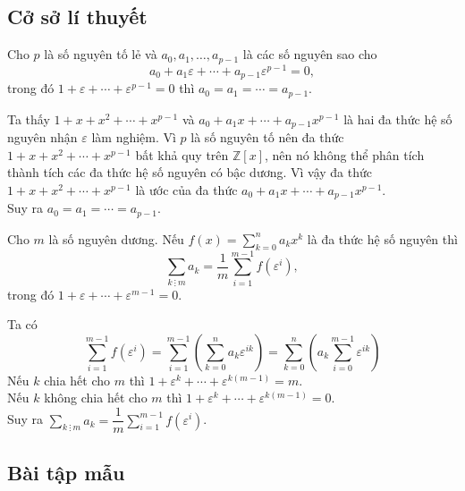 \subsection{Cở sở lí thuyết}
\begin{bode}
	Cho $ p $ là số nguyên tố  lẻ và $ a_0,a_1,\ldots,a_{p-1} $ là các số nguyên sao cho $$ a_0+a_1\varepsilon +\cdots+a_{p-1}\varepsilon^{p-1} =0,$$ trong đó $ 1+\varepsilon+\cdots+\varepsilon^{p-1}=0 $ thì $ a_0=a_1=\cdots=a_{p-1} $.
	\begin{cm}
		Ta thấy $ 1+x+x^2+\cdots+x^{p-1}$ và $ a_0+a_1x+\cdots+a_{p-1}x^{p-1} $ là hai đa thức hệ số nguyên nhận $ \varepsilon $	làm nghiệm. Vì $ p $ là số nguyên tố nên đa thức $ 1+x+x^2+\cdots+x^{p-1}$ bất khả quy trên $ \mathbb{Z}[x] $, nên nó không thể  phân tích thành tích các đa thức hệ số nguyên có bậc dương. Vì vậy  đa thức $ 1+x+x^2+\cdots+x^{p-1}$ là ước của đa thức $ a_0+a_1x+\cdots+a_{p-1}x^{p-1} $.\\
		Suy ra $ a_0=a_1=\cdots=a_{p-1} $.
	\end{cm}
\end{bode}
\begin{bode}
	Cho $ m $ là số nguyên dương. Nếu $ f(x)=\displaystyle\sum\limits_{k=0}^{n}a_kx^k$ là đa thức hệ số nguyên thì 
	$$\displaystyle\sum\limits_{k\ \vdots\  m}a_k=\dfrac{1}{m}\displaystyle\sum\limits_{i=1}^{m-1}f(\varepsilon^i),$$
trong đó $ 1+\varepsilon+\cdots+\varepsilon^{m-1}=0 $.
	\begin{cm}
		Ta có $$ \displaystyle\sum\limits_{i=1}^{m-1}f(\varepsilon^i)=\displaystyle\sum\limits_{i=1}^{m-1}\left(\displaystyle\sum\limits_{k=0}^{n}a_k\varepsilon^{ik} \right)=\displaystyle\sum\limits_{k=0}^{n}\left(a_k\displaystyle\sum\limits_{i=0}^{m-1}\varepsilon^{ik}\right) $$
		Nếu $ k $ chia hết cho $ m $ thì $ 1+\varepsilon^k+\cdots+\varepsilon^{k(m-1)}=m $.\\
		Nếu $ k $ không chia hết cho $ m $ thì $ 1+\varepsilon^k+\cdots+\varepsilon^{k(m-1)}=0 $.\\
		Suy ra $\displaystyle\sum\limits_{k\ \vdots \ m}a_k=\dfrac{1}{m}\displaystyle\sum\limits_{i=1}^{m-1}f(\varepsilon^i)$.
	\end{cm}
\end{bode}


\subsection{Bài tập mẫu}

